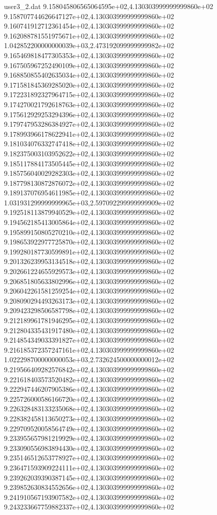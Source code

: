\begin{filecontents}{user3_2.dat}
9.158045806565064595e+02,4.130303999999999860e+02
9.158707744626647127e+02,4.130303999999999860e+02
9.160741912712361454e+02,4.130303999999999860e+02
9.162088781551975671e+02,4.130303999999999860e+02
1.042852200000000039e+03,2.473192099999999982e+02
9.165469818477305353e+02,4.130303999999999860e+02
9.167505967252490109e+02,4.130303999999999860e+02
9.168850855402635034e+02,4.130303999999999860e+02
9.171581845369285020e+02,4.130303999999999860e+02
9.172231892327964715e+02,4.130303999999999860e+02
9.174270021792618763e+02,4.130303999999999860e+02
9.175612929253294396e+02,4.130303999999999860e+02
9.179747953286384927e+02,4.130303999999999860e+02
9.178993966178622941e+02,4.130303999999999860e+02
9.181034076332747418e+02,4.130303999999999860e+02
9.182375003103952622e+02,4.130303999999999860e+02
9.185117884173505445e+02,4.130303999999999860e+02
9.185756040029282303e+02,4.130303999999999860e+02
9.187798130872876072e+02,4.130303999999999860e+02
9.189137076954611985e+02,4.130303999999999860e+02
1.031931299999999965e+03,2.597092299999999909e+02
9.192518113879940529e+02,4.130303999999999860e+02
9.194562185413005864e+02,4.130303999999999860e+02
9.195899150805270210e+02,4.130303999999999860e+02
9.198653922977725870e+02,4.130303999999999860e+02
9.199280187730599891e+02,4.130303999999999860e+02
9.201326239953134518e+02,4.130303999999999860e+02
9.202661224655929573e+02,4.130303999999999860e+02
9.206851805633802996e+02,4.130303999999999860e+02
9.206042261581259254e+02,4.130303999999999860e+02
9.208090294493263173e+02,4.130303999999999860e+02
9.209423298506587798e+02,4.130303999999999860e+02
9.212189961781946295e+02,4.130303999999999860e+02
9.212804335431917480e+02,4.130303999999999860e+02
9.214854349033391827e+02,4.130303999999999860e+02
9.216185372357247161e+02,4.130303999999999860e+02
1.022298700000000053e+03,2.732624500000000012e+02
9.219566409282576842e+02,4.130303999999999860e+02
9.221618403573520482e+02,4.130303999999999860e+02
9.222947446207905386e+02,4.130303999999999860e+02
9.225726000586166720e+02,4.130303999999999860e+02
9.226328483133235068e+02,4.130303999999999860e+02
9.228382458113650273e+02,4.130303999999999860e+02
9.229709520058564749e+02,4.130303999999999860e+02
9.233955657981219929e+02,4.130303999999999860e+02
9.233090556983894430e+02,4.130303999999999860e+02
9.235146512653778927e+02,4.130303999999999860e+02
9.236471593909224111e+02,4.130303999999999860e+02
9.239262039390387145e+02,4.130303999999999860e+02
9.239852630834552656e+02,4.130303999999999860e+02
9.241910567193907582e+02,4.130303999999999860e+02
9.243233667759882337e+02,4.130303999999999860e+02

\end{filecontents}
